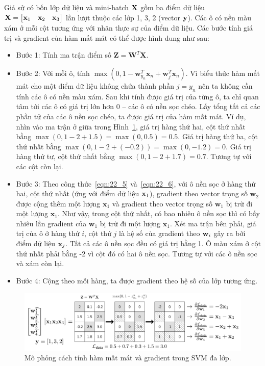 Giả sử có bốn lớp dữ liệu và mini-batch $\mathbf{X}$ gồm ba điểm dữ liệu $\mathbf{X} = \left[\begin{matrix}
\mathbf{x}_1& \mathbf{x}_2 & \mathbf{x}_3\end{matrix}\right]$ lần lượt thuộc các lớp 1, 3, 2
(vector $\mathbf{y}$). Các ô có nền màu xám ở mỗi cột tương ứng với nhãn thực sự của
điểm dữ liệu. Các bước tính giá trị và {gradient} của hàm mất mát có thể được
hình dung như sau:
\begin{itemize}
\item {Bước 1:} Tính ma trận điểm số $\mathbf{Z} = \mathbf{W}^T\mathbf{X}$.

\item {Bước 2:} Với mỗi ô, tính $\max(0, 1 - \mathbf{w}_{y_n}^T
\mathbf{x}_n + \mathbf{w}_j^T\mathbf{x}_n)$. Vì biểu thức hàm mất mát cho một điểm dữ liệu không chứa thành phần $j = y_n$ nên ta không cần tính
các ô có nền màu xám. Sau khi tính được giá trị của từng ô, ta chỉ quan tâm
tới các ô có giá trị lớn hơn 0 -- các ô có nền sọc chéo. Lấy tổng tất cả các
phần tử của các ô nền sọc chéo, ta được giá trị của hàm mất mát. Ví dụ, nhìn
vào ma trận ở giữa trong Hình~\ref{fig:22_7}, giá trị hàng thứ hai, cột
thứ nhất bằng $\max(0, 1 - 2 + 1.5) = \max(0, 0.5) = 0.5$. Giá trị hàng
thứ ba, cột thứ nhất bằng $\max(0, 1 -2 + (-0.2)) = \max(0, -1.2) = 0$. Giá
trị hàng thứ tư, cột thứ nhất bằng $\max(0, 1 - 2 + 1.7) = 0.7$. Tương tự
với các cột còn lại.

\item {Bước 3:} Theo công thức~\eqref{eqn:22_5} và~\eqref{eqn:22_6},
với ô nền sọc ở hàng thứ hai, cột thứ nhất (ứng với điểm dữ liệu $\mathbf{x}_1$),
gradient theo vector trọng số $\mathbf{w}_2$ được cộng thêm một lượng
$\mathbf{x}_1$ và gradient theo vector trọng số $\mathbf{w}_1$ bị trừ đi một
lượng $\mathbf{x}_1$. Như vậy, trong cột thứ nhất, có bao nhiêu ô nền sọc
thì có bấy nhiêu lần gradient của $\mathbf{w}_1$ bị trừ đi một lượng
$\mathbf{x}_1$. Xét ma trận bên phải, giá trị của ô ở hàng thứ $i$, cột thứ
$j$ là hệ số của gradient theo $\mathbf{w}_i$ gây ra bởi điểm dữ liệu $\mathbf{x}_j$. Tất
cả các ô nền sọc đều có giá trị bằng 1. Ô màu xám ở cột thứ nhất phải bằng
-2 vì cột đó có hai ô nền sọc. Tương tự với các ô nền sọc và xám còn lại.

\item {Bước 4:} Cộng theo mỗi hàng, ta được gradient theo
hệ số của lớp tương ứng.
\end{itemize}
\begin{figure}[t]
\centering
\includegraphics[width = \textwidth]{Chapters/09_SupportVectorMachines/22_multiclasssvm/latex/vectorized_loss_gray.pdf}
\caption[]{Mô phỏng cách tính hàm mất mát và gradient trong SVM đa lớp.} \label{fig:22_7}
\end{figure}

